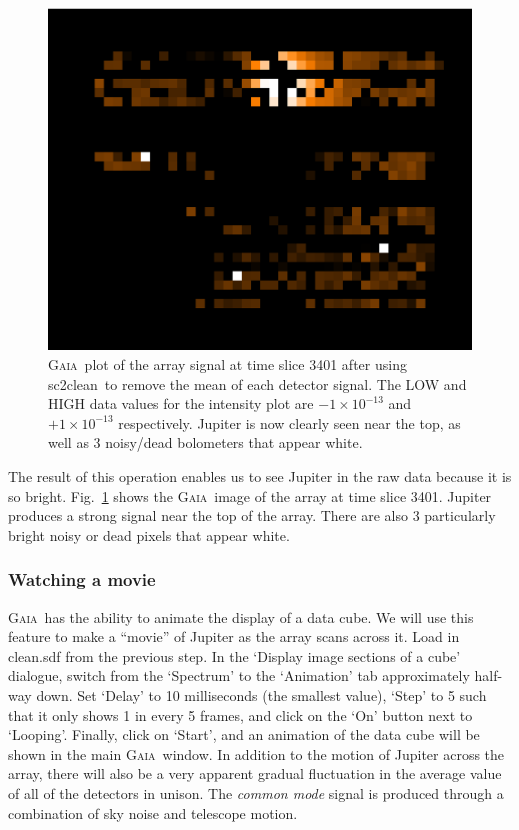 \documentclass[twoside,11pt]{article}
\newcommand{\gaia}{\xref{\textsc{Gaia}}{sun214}{}}
\newcommand{\task}[1]{\textsf{#1}}
\newcommand{\clean}{\xref{\task{sc2clean}}{sun258}{SC2CLEAN}}
\newcommand{\xref}[3]{#1}
\newcommand{\xlabel}[1]{}
\renewcommand{\_}{\texttt{\symbol{95}}}
\begin{document}
\begin{figure}
\begin{center}
\includegraphics[width=0.5\linewidth]{array_mean.eps}
\caption{\gaia\ plot of the array signal at time slice 3401 after
  using \clean\ to remove the mean of each detector signal. The LOW
  and HIGH data values for the intensity plot are $-1\times10^{-13}$
  and $+1\times10^{-13}$ respectively. Jupiter is now clearly seen
  near the top, as well as 3 noisy/dead bolometers that appear white.}
\label{fig:array_mean}
\end{center}
\end{figure}

The result of this operation enables us to see Jupiter in the raw data
because it is so bright. Fig.~\ref{fig:array_mean} shows the \gaia\
image of the array at time slice 3401. Jupiter produces a strong
signal near the top of the array. There are also 3 particularly bright
noisy or dead pixels that appear white. 

\subsubsection{\xlabel{movie}Watching a movie} 

\gaia\ has the ability to animate the display of a data cube. We will
use this feature to make a ``movie'' of Jupiter as the array scans
across it. Load in clean.sdf from the previous step. In the `Display
image sections of a cube' dialogue, switch from the `Spectrum' to the
`Animation' tab approximately half-way down.  Set `Delay' to 10
milliseconds (the smallest value), `Step' to 5 such that it only shows
1 in every 5 frames, and click on the `On' button next to
`Looping'. Finally, click on `Start', and an animation of the data
cube will be shown in the main \gaia\ window. In addition to the
motion of Jupiter across the array, there will also be a very apparent
gradual fluctuation in the average value of all of the detectors in
unison. The {\em common mode} signal is produced through a combination
of sky noise and telescope motion.
\end{document}
